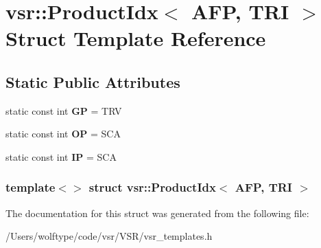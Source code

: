 \hypertarget{structvsr_1_1_product_idx_3_01_a_f_p_00_01_t_r_i_01_4}{\section{vsr\-:\-:Product\-Idx$<$ A\-F\-P, T\-R\-I $>$ Struct Template Reference}
\label{structvsr_1_1_product_idx_3_01_a_f_p_00_01_t_r_i_01_4}
}
\subsection*{Static Public Attributes}
\begin{DoxyCompactItemize}
\item 
\hypertarget{structvsr_1_1_product_idx_3_01_a_f_p_00_01_t_r_i_01_4_adea76098621758397d75c74e45cfe4ca}{static const int {\bfseries G\-P} = T\-R\-V}\label{structvsr_1_1_product_idx_3_01_a_f_p_00_01_t_r_i_01_4_adea76098621758397d75c74e45cfe4ca}

\item 
\hypertarget{structvsr_1_1_product_idx_3_01_a_f_p_00_01_t_r_i_01_4_a9fba3d888f8c0a58bef31f0c9e7bc33f}{static const int {\bfseries O\-P} = S\-C\-A}\label{structvsr_1_1_product_idx_3_01_a_f_p_00_01_t_r_i_01_4_a9fba3d888f8c0a58bef31f0c9e7bc33f}

\item 
\hypertarget{structvsr_1_1_product_idx_3_01_a_f_p_00_01_t_r_i_01_4_a775273d73ae24fea8c3388633559cc94}{static const int {\bfseries I\-P} = S\-C\-A}\label{structvsr_1_1_product_idx_3_01_a_f_p_00_01_t_r_i_01_4_a775273d73ae24fea8c3388633559cc94}

\end{DoxyCompactItemize}
\subsubsection*{template$<$$>$ struct vsr\-::\-Product\-Idx$<$ A\-F\-P, T\-R\-I $>$}



The documentation for this struct was generated from the following file\-:\begin{DoxyCompactItemize}
\item 
/\-Users/wolftype/code/vsr/\-V\-S\-R/vsr\-\_\-templates.\-h\end{DoxyCompactItemize}
